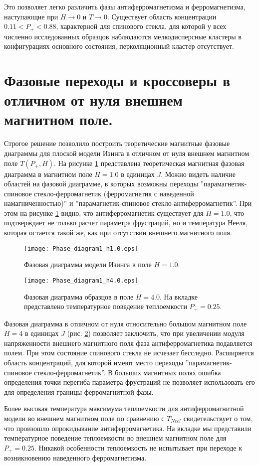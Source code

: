 Это позволяет легко различить фазы антиферромагнетизма и ферромагнетизма, наступающие при $H \rightarrow 0$ и $T \rightarrow 0$. Существует область концентрации $0.11<P_{+}<0.88$, характерной для спинового стекла, для которой у всех численно исследованных образцов наблюдаются мелкодисперсные кластеры в конфигурациях основного состояния, перколяционный кластер отсутствует.

\section{Фазовые переходы и кроссоверы в отличном от нуля внешнем магнитном поле.}

Строгое решение позволило построить теоретические магнитные фазовые диаграммы для плоской модели Изинга в отличном от нуля внешнем магнитном поле $T(P_{+},H)$. На рисунке \ref{fig:Diag1} представлена теоретическая магнитная фазовая диаграмма в магнитном поле $H=1.0$ в единицах $J$. Можно видеть наличие областей на фазовой диаграмме, в которых возможны переходы ''парамагнетик-спиновое стекло-ферромагнетик (ферромагнетик с наведенной намагниченностью)''  и ''парамагнетик-спиновое стекло-антиферромагнетик''. При этом на рисунке \ref{fig:Diag1} видно, что антиферромагнетик существует для $H=1.0$, что подтверждает не только расчет параметра фрустраций, но и температура Нееля, которая остается такой же, как при отсутствии внешнего магнитного поля.


\begin{figure}[!ht]
	\centering
	\texttt{[image: Phase\_diagram1\_h1.0.eps]}
	\caption{Фазовая диаграмма модели Изинга в поле $H = 1.0$.}
	\label{fig:Diag1}
\end{figure}

\begin{figure}[!ht]
	\centering
	\texttt{[image: Phase\_diagram1\_h4.0.eps]}
	\caption{Фазовая диаграмма образцов в поле $H = 4.0$. На вкладке представлено температурное поведение теплоемкости $P_{+}=0.25$.}
	\label{fig:Diag4}
\end{figure}

Фазовая диаграмма в отличном от нуля относительно большом магнитном поле $H=4$ в единицах $J$ (рис. \ref{fig:Diag4}) позволяет заключить, что при увеличении модуля напряженности внешнего магнитного поля фаза антиферромагнетика подавляется полем. При этом состояние спинового стекла не исчезает бесследно. Расширяется область концентраций, для которой имеют место переходы ''парамагнетик-спиновое стекло-ферромагнетик''. В больших магнитных полях ошибка определения точки перегиба параметра фрустраций не позволяет использовать его для определения границы ферромагнитной фазы.  

Более высокая температура максимума теплоемкости для антиферромагнитной модели во внешнем магнитном поле по сравнению с $T_{Neel}$ свидетельствует о том, что произошло опрокидывание антиферромагнетика. На вкладке мы представили температурное поведение теплоемкости во внешнем магнитном поле для $P_+=0.25$. Никакой особенности теплоемкость не испытывает при переходе к возникновению наведенного ферромагнетизма.